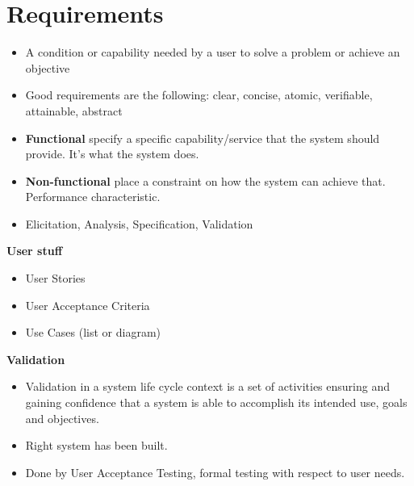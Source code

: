 \documentclass{article}
\begin{document}
\section{Requirements}
    \begin{itemize}
        \renewcommand\labelitemi{--}
        \item A condition or capability needed by a user to solve a problem or achieve an objective
        \item Good requirements are the following: clear, concise, atomic, verifiable, attainable, abstract 
        \item \textbf{Functional} specify a specific capability/service that the system should provide. It's what the system does.
        \item \textbf{Non-functional} place a constraint on how the system can achieve that. Performance characteristic.
        \item Elicitation, Analysis, Specification, Validation
    \end{itemize}
\textbf{User stuff}
    \begin{itemize}
        \renewcommand\labelitemi{--}
        \item User Stories
        \item User Acceptance Criteria
        \item Use Cases (list or diagram)
    \end{itemize}
\textbf{Validation}
    \begin{itemize}
        \renewcommand\labelitemi{--}
        \item Validation in a system life cycle context is a set of activities ensuring and gaining confidence that a system is able to accomplish its intended use, goals and objectives.
        \item Right system has been built.
        \item Done by User Acceptance Testing, formal testing with respect to user needs. 
    \end{itemize}
\end{document}
